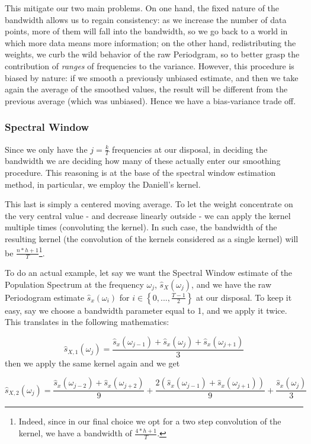 \documentclass[12pt]{article} %
\begin{document}
This mitigate our two main problems. On one hand, the fixed nature of the bandwidth allows us to regain consistency: as we increase the number of data points, more of them will fall into the bandwidth, so we go back to a world in which more data means more information; on the other hand, redistributing the weights, we curb the wild behavior of the raw Periodgram, so to better grasp the contribution of {\em ranges} of frequencies to the variance. However, this procedure is biased by nature: if we smooth a previously unbiased estimate, and then we take again the average of the smoothed values, the result will be different from the previous average (which was unbiased). Hence we have a bias-variance trade off.
 
\subsubsection{Spectral Window}

Since we only have the  $j=\frac{k}{T}$ frequencies at our disposal, in deciding the bandwidth we are deciding how many of these actually enter our smoothing procedure. This reasoning is at the base of the spectral window estimation method, in particular, we employ the Daniell's kernel. 

This last is simply a centered moving average. To let the weight concentrate on the very central value - and decrease linearly outside - we can apply the kernel multiple times (convoluting the kernel). In such case, the bandwidth of the resulting kernel (the convolution of the kernels considered as a single kernel) will be $\frac{n*h+1}{T}$\footnote{
Indeed, since in our final choice we opt for a two step convolution of the kernel, we have a bandwidth of $\frac{4*h+1}{T}$.}.

To do an actual example, let say we want the Spectral Window estimate of the Population Spectrum at the frequency $\omega_j$, $\hat{s}_X(\omega_j)$, and we have the raw Periodogram estimate $\hat{s}_x(\omega_i)$ for $i\in\left\{0,...,\frac{T-1}{2}\right\}$ at our disposal. To keep it easy, say we choose a bandwidth parameter equal to 1, and we apply it twice. This translates in the following mathematics:

\begin{equation}
\hat{s}_{X,1}(\omega_j)=\frac{\hat{s}_x(\omega_{j-1})+\hat{s}_x(\omega_j)+\hat{s}_x(\omega_{j+1})}{3}
\end{equation} then we apply the same kernel again and we get

\begin{equation}
\hat{s}_{X,2}(\omega_j)=\frac{\hat{s}_x(\omega_{j-2})+\hat{s}_x(\omega_{j+2})}{9}+\frac{2(\hat{s}_x(\omega_{j-1})+\hat{s}_x(\omega_{j+1}))}{9}+\frac{\hat{s}_x(\omega_j)}{3}
\end{equation}
\end{document}
